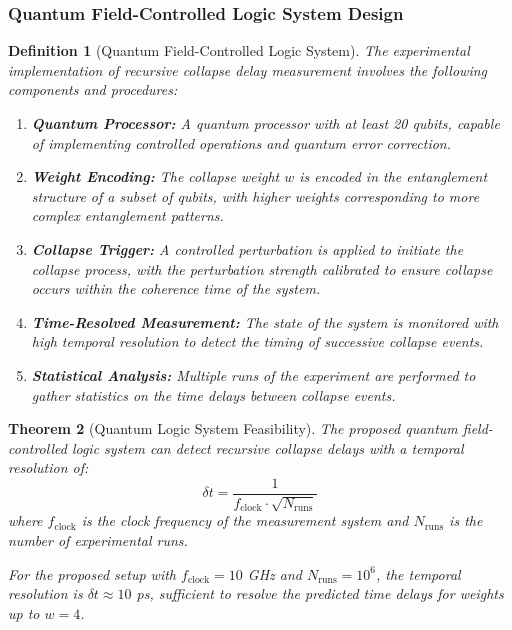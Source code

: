 \documentclass[11pt,a4paper]{article}
\newtheorem{theorem}{Theorem}[section]
\newtheorem{definition}[theorem]{Definition}
\begin{document}
\subsubsection{Quantum Field-Controlled Logic System Design}
\label{ssubsec:quantum_logic_system}

\begin{definition}[Quantum Field-Controlled Logic System]
\label{def:quantum_logic_system}
The experimental implementation of recursive collapse delay measurement involves the following components and procedures:

\begin{enumerate}
    \item \textbf{Quantum Processor:} A quantum processor with at least 20 qubits, capable of implementing controlled operations and quantum error correction.
    
    \item \textbf{Weight Encoding:} The collapse weight $w$ is encoded in the entanglement structure of a subset of qubits, with higher weights corresponding to more complex entanglement patterns.
    
    \item \textbf{Collapse Trigger:} A controlled perturbation is applied to initiate the collapse process, with the perturbation strength calibrated to ensure collapse occurs within the coherence time of the system.
    
    \item \textbf{Time-Resolved Measurement:} The state of the system is monitored with high temporal resolution to detect the timing of successive collapse events.
    
    \item \textbf{Statistical Analysis:} Multiple runs of the experiment are performed to gather statistics on the time delays between collapse events.
\end{enumerate}
\end{definition}

\begin{theorem}[Quantum Logic System Feasibility]
\label{thm:quantum_logic_feasibility}
The proposed quantum field-controlled logic system can detect recursive collapse delays with a temporal resolution of:
\begin{equation}
\delta t = \frac{1}{f_{\text{clock}} \cdot \sqrt{N_{\text{runs}}}}
\end{equation}
where $f_{\text{clock}}$ is the clock frequency of the measurement system and $N_{\text{runs}}$ is the number of experimental runs.

For the proposed setup with $f_{\text{clock}} = 10$ GHz and $N_{\text{runs}} = 10^6$, the temporal resolution is $\delta t \approx 10$ ps, sufficient to resolve the predicted time delays for weights up to $w=4$.
\end{theorem}
\end{document}
